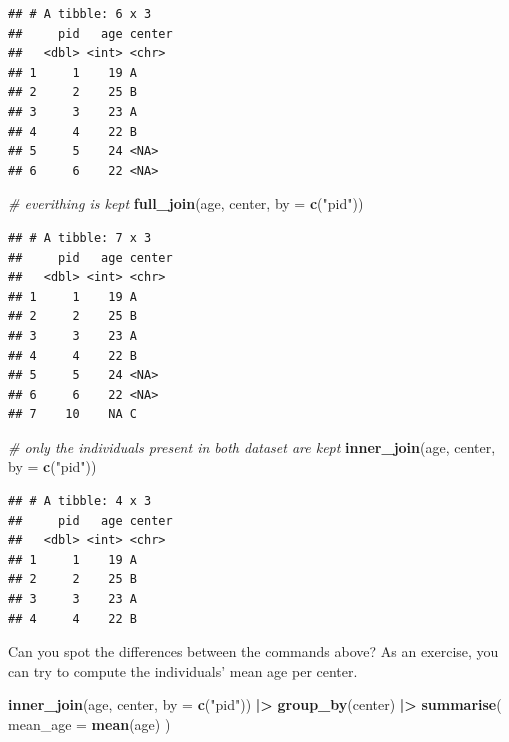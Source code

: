 \documentclass[
]{book}
\newenvironment{Shaded}{\begin{snugshade}}{\end{snugshade}}
\newcommand{\AttributeTok}[1]{\textcolor[rgb]{0.13,0.29,0.53}{#1}}
\newcommand{\CommentTok}[1]{\textcolor[rgb]{0.56,0.35,0.01}{\textit{#1}}}
\newcommand{\FunctionTok}[1]{\textcolor[rgb]{0.13,0.29,0.53}{\textbf{#1}}}
\newcommand{\NormalTok}[1]{#1}
\newcommand{\SpecialCharTok}[1]{\textcolor[rgb]{0.81,0.36,0.00}{\textbf{#1}}}
\newcommand{\StringTok}[1]{\textcolor[rgb]{0.31,0.60,0.02}{#1}}
\begin{document}
\begin{verbatim}
## # A tibble: 6 x 3
##     pid   age center
##   <dbl> <int> <chr> 
## 1     1    19 A     
## 2     2    25 B     
## 3     3    23 A     
## 4     4    22 B     
## 5     5    24 <NA>  
## 6     6    22 <NA>
\end{verbatim}

\begin{Shaded}
\begin{Highlighting}[]
\CommentTok{\# everithing is kept}
\FunctionTok{full\_join}\NormalTok{(age, center, }\AttributeTok{by =} \FunctionTok{c}\NormalTok{(}\StringTok{"pid"}\NormalTok{))}
\end{Highlighting}
\end{Shaded}

\begin{verbatim}
## # A tibble: 7 x 3
##     pid   age center
##   <dbl> <int> <chr> 
## 1     1    19 A     
## 2     2    25 B     
## 3     3    23 A     
## 4     4    22 B     
## 5     5    24 <NA>  
## 6     6    22 <NA>  
## 7    10    NA C
\end{verbatim}

\begin{Shaded}
\begin{Highlighting}[]
\CommentTok{\# only the individuals present in both dataset are kept}
\FunctionTok{inner\_join}\NormalTok{(age, center, }\AttributeTok{by =} \FunctionTok{c}\NormalTok{(}\StringTok{"pid"}\NormalTok{))}
\end{Highlighting}
\end{Shaded}

\begin{verbatim}
## # A tibble: 4 x 3
##     pid   age center
##   <dbl> <int> <chr> 
## 1     1    19 A     
## 2     2    25 B     
## 3     3    23 A     
## 4     4    22 B
\end{verbatim}

Can you spot the differences between the commands above?
As an exercise, you can try to compute the individuals' mean age per center.

\begin{Shaded}
\begin{Highlighting}[]
\FunctionTok{inner\_join}\NormalTok{(age, center, }\AttributeTok{by =} \FunctionTok{c}\NormalTok{(}\StringTok{"pid"}\NormalTok{)) }\SpecialCharTok{|\textgreater{}}
  \FunctionTok{group\_by}\NormalTok{(center) }\SpecialCharTok{|\textgreater{}}
  \FunctionTok{summarise}\NormalTok{(}
    \AttributeTok{mean\_age =} \FunctionTok{mean}\NormalTok{(age)}
\NormalTok{  )}
\end{Highlighting}
\end{Shaded}
\end{document}
